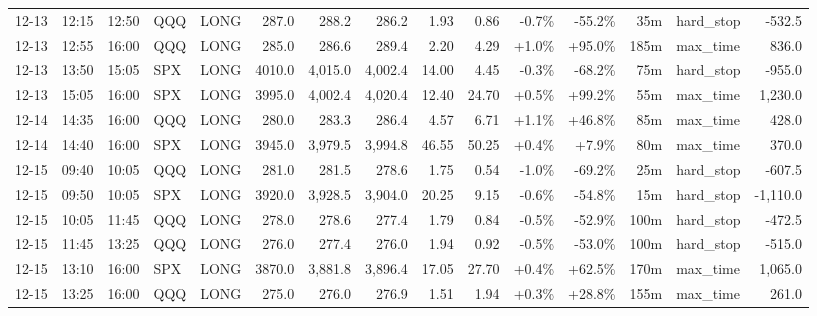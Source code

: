 \documentclass[11pt,a4paper,twoside]{article}
\begin{document}
\begin{landscape}
\begin{center}
\begin{longtable}{>{\color{txtmain}}l l l l l r r r r r r r r >{\color{txtmain}}l r}
12-13 & 12:15 & 12:50 & QQQ & LONG & 287.0 & 288.2 & 286.2 & 1.93 & 0.86 & \textcolor{lossred}{-0.7\%} & \textcolor{lossred}{-55.2\%} & 35m & hard\_stop & \textcolor{lossred}{-532.5} \\
12-13 & 12:55 & 16:00 & QQQ & LONG & 285.0 & 286.6 & 289.4 & 2.20 & 4.29 & \textcolor{wingreen}{+1.0\%} & \textcolor{wingreen}{+95.0\%} & 185m & max\_time & \textcolor{wingreen}{836.0} \\
12-13 & 13:50 & 15:05 & SPX & LONG & 4010.0 & 4,015.0 & 4,002.4 & 14.00 & 4.45 & \textcolor{lossred}{-0.3\%} & \textcolor{lossred}{-68.2\%} & 75m & hard\_stop & \textcolor{lossred}{-955.0} \\
12-13 & 15:05 & 16:00 & SPX & LONG & 3995.0 & 4,002.4 & 4,020.4 & 12.40 & 24.70 & \textcolor{wingreen}{+0.5\%} & \textcolor{wingreen}{+99.2\%} & 55m & max\_time & \textcolor{wingreen}{1,230.0} \\
12-14 & 14:35 & 16:00 & QQQ & LONG & 280.0 & 283.3 & 286.4 & 4.57 & 6.71 & \textcolor{wingreen}{+1.1\%} & \textcolor{wingreen}{+46.8\%} & 85m & max\_time & \textcolor{wingreen}{428.0} \\
12-14 & 14:40 & 16:00 & SPX & LONG & 3945.0 & 3,979.5 & 3,994.8 & 46.55 & 50.25 & \textcolor{wingreen}{+0.4\%} & \textcolor{wingreen}{+7.9\%} & 80m & max\_time & \textcolor{wingreen}{370.0} \\
12-15 & 09:40 & 10:05 & QQQ & LONG & 281.0 & 281.5 & 278.6 & 1.75 & 0.54 & \textcolor{lossred}{-1.0\%} & \textcolor{lossred}{-69.2\%} & 25m & hard\_stop & \textcolor{lossred}{-607.5} \\
12-15 & 09:50 & 10:05 & SPX & LONG & 3920.0 & 3,928.5 & 3,904.0 & 20.25 & 9.15 & \textcolor{lossred}{-0.6\%} & \textcolor{lossred}{-54.8\%} & 15m & hard\_stop & \textcolor{lossred}{-1,110.0} \\
12-15 & 10:05 & 11:45 & QQQ & LONG & 278.0 & 278.6 & 277.4 & 1.79 & 0.84 & \textcolor{lossred}{-0.5\%} & \textcolor{lossred}{-52.9\%} & 100m & hard\_stop & \textcolor{lossred}{-472.5} \\
12-15 & 11:45 & 13:25 & QQQ & LONG & 276.0 & 277.4 & 276.0 & 1.94 & 0.92 & \textcolor{lossred}{-0.5\%} & \textcolor{lossred}{-53.0\%} & 100m & hard\_stop & \textcolor{lossred}{-515.0} \\
12-15 & 13:10 & 16:00 & SPX & LONG & 3870.0 & 3,881.8 & 3,896.4 & 17.05 & 27.70 & \textcolor{wingreen}{+0.4\%} & \textcolor{wingreen}{+62.5\%} & 170m & max\_time & \textcolor{wingreen}{1,065.0} \\
12-15 & 13:25 & 16:00 & QQQ & LONG & 275.0 & 276.0 & 276.9 & 1.51 & 1.94 & \textcolor{wingreen}{+0.3\%} & \textcolor{wingreen}{+28.8\%} & 155m & max\_time & \textcolor{wingreen}{261.0} \\

\end{longtable}
\end{center}
\end{landscape}
\end{document}
